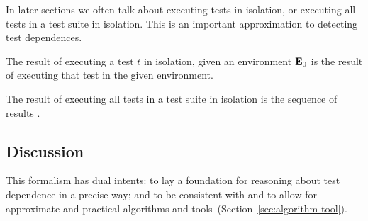 %
%
%

In later sections we often talk about executing tests in isolation, or
executing all tests in a test suite in isolation. This is an important
approximation to detecting test dependences.

\begin{definition}
The result of executing a test\/ $t$ in isolation, given an
environment\/
$\mathbf{E}_0$ is the result\/  of executing that test in
the given environment.  

The result of executing all tests in a test suite\/  in isolation is the
sequence of results\/ .
\end{definition}



\subsection{Discussion}

This formalism has dual intents:
to lay a foundation for reasoning about test dependence
in a precise way; and
to be consistent with and to allow for approximate and practical algorithms and tools~(Section~\ref{sec:algorithm-tool}).

